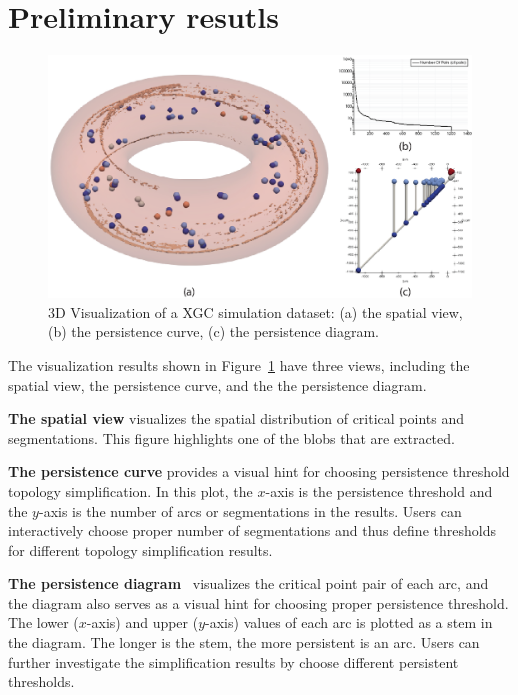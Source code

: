 \section{Preliminary resutls}
\label{sec:results}

\begin{figure}
  \centering
  \includegraphics[width=\linewidth]{Figs/simplification3D}
  \caption{3D Visualization of a XGC simulation dataset: (a) the spatial view, (b) the persistence curve, (c) the persistence diagram.}
  \label{fig:results}
\end{figure}



The visualization results shown in Figure~\ref{fig:results} have three views, including the spatial view, the persistence curve, and the the persistence diagram.  

{\bf The spatial view} visualizes the spatial distribution of critical points and segmentations.  This figure highlights one of the blobs that are extracted.  

{\bf The persistence curve} provides a visual hint for choosing persistence threshold topology simplification.  In this plot, the $x$-axis is the persistence threshold and the $y$-axis is the number of arcs or segmentations in the results.  Users can interactively choose proper number of segmentations and thus define thresholds for different topology simplification results.  

{\bf The persistence diagram}~\cite{EdelsbrunnerLZ02} visualizes the critical point pair of each arc, and the diagram also serves as a visual hint for choosing proper persistence threshold.  The lower ($x$-axis) and upper ($y$-axis) values of each arc is plotted as a stem in the diagram.  The longer is the stem, the more persistent is an arc.  Users can further investigate the simplification results by choose different persistent thresholds.  

